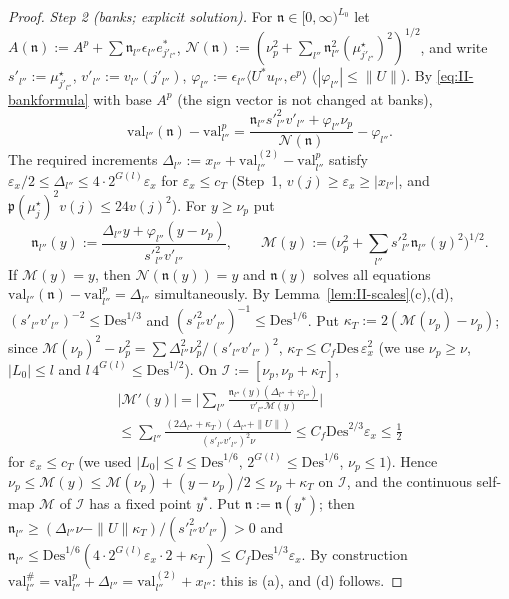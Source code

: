 \documentclass[10pt]{amsart}
\theoremstyle{definition}
\theoremstyle{remark}
\newcommand{\ip}[2]{\langle #1,#2\rangle}
\begin{document}
\begin{proof}
\emph{Step 2 (banks; explicit solution).}  For $\mathfrak n\in[0,\infty)^{L_0}$
let $A(\mathfrak n):=A^p+\sum\mathfrak n_{l''}\epsilon_{l''}e^*_{j'_{l''}}$,
$\mathcal N(\mathfrak n):=(\nu_p^2+\sum_{l''}\mathfrak n_{l''}^2
(\mu^\star_{j'_{l''}})^2)^{1/2}$, and write $s'_{l''}:=\mu^\star_{j'_{l''}}$,
$v'_{l''}:=v_{l''}(j'_{l''})$, $\varphi_{l''}:=\epsilon_{l''}\ip{U^*u_{l''}}
{e^p}$ ($|\varphi_{l''}|\le\|U\|$).  By \eqref{eq:II-bankformula} with base
$A^p$ (the sign vector is not changed at banks),
\[
 \mathrm{val}_{l''}(\mathfrak n)-\mathrm{val}^p_{l''}=\frac{\mathfrak n_{l''}
 s'^2_{l''}v'_{l''}+\varphi_{l''}\nu_p}{\mathcal N(\mathfrak n)}-
 \varphi_{l''} .
\]
The required increments $\Delta_{l''}:=x_{l''}+\mathrm{val}^{(2)}_{l''}-
\mathrm{val}^p_{l''}$ satisfy $\varepsilon_x/2\le\Delta_{l''}\le4\cdot
2^{G(l)}\varepsilon_x$ for $\varepsilon_x\le c_T$ (Step~1, $v(j)\ge
\varepsilon_x\ge|x_{l''}|$, and $\mathfrak p(\mu^\star_j)^2v(j)\le24v(j)^2$).
For $y\ge\nu_p$ put
\[
 \mathfrak n_{l''}(y):=\frac{\Delta_{l''}y+\varphi_{l''}(y-\nu_p)}
 {s'^2_{l''}v'_{l''}},\qquad\mathcal M(y):=\Big(\nu_p^2+\sum_{l''}s'^2_{l''}
 \mathfrak n_{l''}(y)^2\Big)^{1/2} .
\]
If $\mathcal M(y)=y$, then $\mathcal N(\mathfrak n(y))=y$ and
$\mathfrak n(y)$ solves all equations $\mathrm{val}_{l''}(\mathfrak n)-
\mathrm{val}^p_{l''}=\Delta_{l''}$ simultaneously.  By
Lemma~\ref{lem:II-scales}(c),(d), $(s'_{l''}v'_{l''})^{-2}\le
\mathrm{Des}^{1/3}$ and $(s'^2_{l''}v'_{l''})^{-1}\le\mathrm{Des}^{1/6}$.
Put $\kappa_T:=2(\mathcal M(\nu_p)-\nu_p)$; since $\mathcal M(\nu_p)^2-\nu_p^2
=\sum\Delta_{l''}^2\nu_p^2/(s'_{l''}v'_{l''})^2$,
$\kappa_T\le C_f\mathrm{Des}\,\varepsilon_x^2$ (we use $\nu_p\ge\nu$,
$|L_0|\le l$ and $l\,4^{G(l)}\le\mathrm{Des}^{1/2}$).  On $\mathcal I:=[\nu_p,
\nu_p+\kappa_T]$,
\begin{multline*}
 |\mathcal M'(y)|=\Big|\sum_{l''}\frac{\mathfrak n_{l''}(y)(\Delta_{l''}+
 \varphi_{l''})}{v'_{l''}\mathcal M(y)}\Big|\\\le\sum_{l''}\frac{(2\Delta_{l''}
 +\kappa_T)(\Delta_{l''}+\|U\|)}{(s'_{l''}v'_{l''})^2\nu}\le C_f
 \mathrm{Des}^{2/3}\varepsilon_x\le\tfrac12
\end{multline*}
for $\varepsilon_x\le c_T$ (we used $|L_0|\le l\le\mathrm{Des}^{1/6}$,
$2^{G(l)}\le\mathrm{Des}^{1/6}$, $\nu_p\le1$).  Hence $\nu_p\le\mathcal M(y)
\le\mathcal M(\nu_p)+(y-\nu_p)/2\le\nu_p+\kappa_T$ on $\mathcal I$, and the
continuous self-map $\mathcal M$ of $\mathcal I$ has a fixed point $y^*$.
Put $\mathfrak n:=\mathfrak n(y^*)$; then $\mathfrak n_{l''}\ge(\Delta_{l''}
\nu-\|U\|\kappa_T)/(s'^2_{l''}v'_{l''})>0$ and $\mathfrak n_{l''}\le
\mathrm{Des}^{1/6}(4\cdot2^{G(l)}\varepsilon_x\cdot2+\kappa_T)\le C_f
\mathrm{Des}^{1/3}\varepsilon_x$.  By construction
$\mathrm{val}^\#_{l''}=\mathrm{val}^p_{l''}+\Delta_{l''}=
\mathrm{val}^{(2)}_{l''}+x_{l''}$: this is (a), and (d) follows.


\end{proof}
\end{document}

